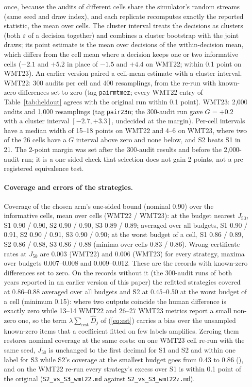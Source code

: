 \documentclass[11pt]{article}
\newcommand{\eps}{\varepsilon}
\newcommand{\Jt}{J_{50}}
\begin{document}
once, because the audits of different cells share the simulator's random streams (same seed and draw index), and each
replicate recomputes exactly the reported statistic, the mean over cells. The cluster interval treats the decisions as
clusters (both $\eps$ of a decision together) and combines a cluster bootstrap with the joint draws; its point estimate
is the mean over decisions of the within-decision mean, which differs from the cell mean where a decision keeps one or
two informative cells ($-2.1$ and $+5.2$ in place of $-1.5$ and $+4.4$ on WMT22; within 0.1 point on WMT23). An earlier
version paired a cell-mean estimate with a cluster interval. WMT22: 300 audits per cell and 400 resamplings, from the
re-run with known-zero differences set to zero (tag \texttt{pairmtmez}; every WMT22 entry of Table~\ref{tab:heldout}
agrees with the original run within 0.1 point). WMT23: 2,000 audits and 1,000 resamplings (tag \texttt{pair23n}; the
300-audit run gave $G=+0.2$ with a cluster interval $[-2.7, +3.3]$, undecided at the margin). Per-cell intervals have a
median width of 15--18 points on WMT22 and 4--6 on WMT23, where two of the 26 cells have a $G$ interval above zero and
none below, and S2 beats S1 in 21. The 2-point margin was set after the 300-audit results and before the 2,000-audit
run; it is a one-sided check that selection does not gain 2 points, not a pre-registered equivalence test.

\paragraph{Coverage and errors of the strategies.} Coverage of the chosen arm's one-sided bound (nominal 0.90) over
the informative cells, mean over cells (WMT22 / WMT23): at the budget nearest $\Jt$, S1 0.90 / 0.90, S2 0.90 / 0.90,
S3 0.89 / 0.89; averaged over all budgets, S1 0.90 / 0.91, S2 0.90 / 0.91, S3 0.90 / 0.90; at the worst budget of a
cell, S1 0.86 / 0.89, S2 0.86 / 0.88, S3 0.86 / 0.88 (minima over cells 0.83 / 0.86). Wrong-certificate rates at
$\Jt$ are 0.003 (WMT22) and 0.006 (WMT23) for every strategy, maxima over budgets 0.007--0.008 and 0.009--0.012. These
are the records with known-zero differences set to zero. On the records without it (the 300-audit runs of both years
reported in an earlier version of this paper) the refitted strategies covered at 0.86--0.88 averaged over all budgets
and S2 at 0.45--0.50 at the worst budget of a cell (minimum 0.15): where two outputs coincide the human difference is
exactly zero while 13--14 WMT22 and 26--27 WMT23 metrics report a small non-zero one, so the term
$\lambda\sum_{\text{rest}}\hat D_j$ of (\ref{eq:est}) carries a bias over the unsampled known-zero items that a
coefficient fitted on few labels amplifies. Zeroing them restores nominal coverage at the same costs: on one WMT23
cell re-run with the same seed, $\Jt$ is unchanged to the first decimal for S1 and S2 and within one label for S3
while S2's coverage at the smallest budget goes from 0.43 to 0.86
(), and on the WMT22 re-run every strategy's excess over
S1 is within 0.1 point of the original (\texttt{S2\_vs\_S3\_wmt22.md} against \texttt{S2\_vs\_S3\_wmt22z.md}).
\end{document}
